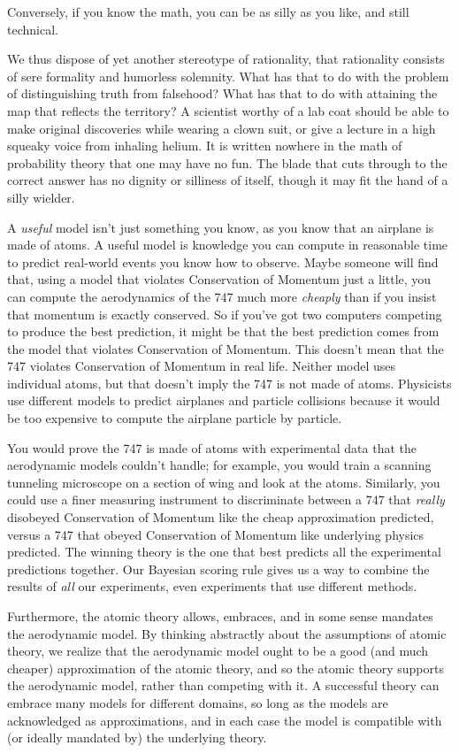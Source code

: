 {
 Conversely, if you know the math, you can be as silly as you like,
and still technical.}

{
 We thus dispose of yet another stereotype of rationality, that
rationality consists of sere formality and humorless solemnity. What
has that to do with the problem of distinguishing truth from falsehood?
What has that to do with attaining the map that reflects the territory?
A scientist worthy of a lab coat should be able to make original
discoveries while wearing a clown suit, or give a lecture in a high
squeaky voice from inhaling helium. It is written nowhere in the math
of probability theory that one may have no fun. The blade that cuts
through to the correct answer has no dignity or silliness of itself,
though it may fit the hand of a silly wielder.}

{
 A \textit{useful} model isn't just something you
know, as you know that an airplane is made of atoms. A useful model is
knowledge you can compute in reasonable time to predict real-world
events you know how to observe. Maybe someone will find that, using a
model that violates Conservation of Momentum just a little, you can
compute the aerodynamics of the 747 much more \textit{cheaply} than if
you insist that momentum is exactly conserved. So if
you've got two computers competing to produce the best
prediction, it might be that the best prediction comes from the model
that violates Conservation of Momentum. This doesn't
mean that the 747 violates Conservation of Momentum in real life.
Neither model uses individual atoms, but that doesn't
imply the 747 is not made of atoms. Physicists use different models to
predict airplanes and particle collisions because it would be too
expensive to compute the airplane particle by particle.}

{
 You would prove the 747 is made of atoms with experimental data
that the aerodynamic models couldn't handle; for
example, you would train a scanning tunneling microscope on a section
of wing and look at the atoms. Similarly, you could use a finer
measuring instrument to discriminate between a 747 that \textit{really}
disobeyed Conservation of Momentum like the cheap approximation
predicted, versus a 747 that obeyed Conservation of Momentum like
underlying physics predicted. The winning theory is the one that best
predicts all the experimental predictions together. Our Bayesian
scoring rule gives us a way to combine the results of \textit{all} our
experiments, even experiments that use different methods.}

{
 Furthermore, the atomic theory allows, embraces, and in some sense
mandates the aerodynamic model. By thinking abstractly about the
assumptions of atomic theory, we realize that the aerodynamic model
ought to be a good (and much cheaper) approximation of the atomic
theory, and so the atomic theory supports the aerodynamic model, rather
than competing with it. A successful theory can embrace many models for
different domains, so long as the models are acknowledged as
approximations, and in each case the model is compatible with (or
ideally mandated by) the underlying theory.}

